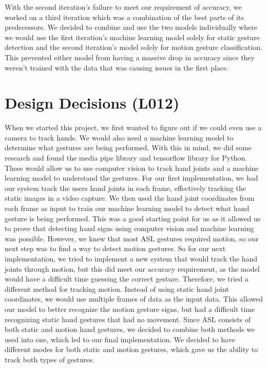 \documentclass[12pt, titlepage]{article}
\begin{document}
\noindent With the second iteration’s failure to meet our requirement of accuracy, we worked on a third iteration which was a combination of the best parts of its predecessors. We decided to combine and use the two models individually where we would use the first iteration’s machine learning model solely for static gesture detection and the second iteration’s model solely for motion gesture classification. This prevented either model from having a massive drop in accuracy since they weren’t trained with the data that was causing issues in the first place. \\


\section{Design Decisions (L012)}

When we started this project, we first wanted to figure out if we could even use a camera to track hands. We would also need a machine learning model to determine what gestures are being performed. With this in mind, we did some research and found the media pipe library and tensorflow library for Python. These would allow us to use computer vision to track hand joints and a machine learning model to understand the gestures. For our first implementation, we had our system track the users hand joints in each frame, effectively tracking the static images in a video capture. We then used the hand joint coordinates from each frame as input to train our machine learning model to detect what hand gesture is being performed. This was a good starting point for us as it allowed us to prove that detecting hand signs using computer vision and machine learning was possible. However, we knew that most ASL gestures required motion, so our next step was to find a way to detect motion gestures. So for our next implementation, we tried to implement a new system that would track the hand joints through motion, but this did meet our accuracy requirement, as the model would have a difficult time guessing the correct gesture. Therefore, we tried a different method for tracking motion. Instead of using static hand joint coordinates, we would use multiple frames of data as the input data. This allowed our model to better recognize the motion gesture signs, but had a difficult time recognizing static hand gestures that had no movement. Since ASL consists of both static and motion hand gestures, we decided to combine both methods we used into one, which led to our final implementation. We decided to have different modes for both static and motion gestures, which gave us the ability to track both types of gestures.\\
\end{document}
